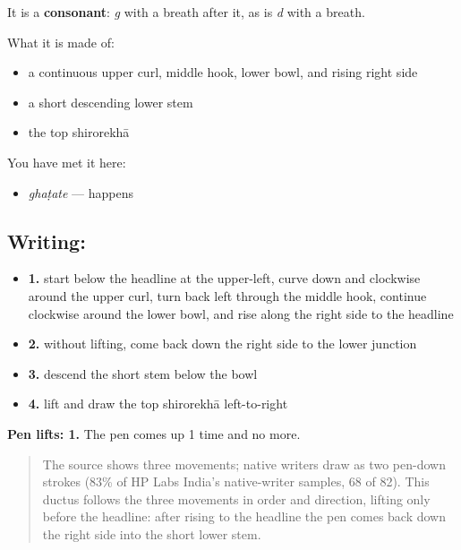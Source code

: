 It is a \textbf{consonant}: \emph{g} with a breath after it, as \textbf{} is \emph{d} with a breath.

What it is made of:

\begin{itemize}
\raggedright
  \item a continuous upper curl, middle hook, lower bowl, and rising right side
  \item a short descending lower stem
  \item the top shirorekhā
\end{itemize}

You have met it here:

\begin{itemize}
\raggedright
  \item \textbf{} \emph{ghaṭate} — happens
\end{itemize}

\subsection*{Writing: }

\begin{itemize}
\raggedright
  \item \textbf{1.} start below the headline at the upper-left, curve down and clockwise around the upper curl, turn back left through the middle hook, continue clockwise around the lower bowl, and rise along the right side to the headline
  \item \textbf{2.} without lifting, come back down the right side to the lower junction
  \item \textbf{3.} descend the short stem below the bowl
  \item \textbf{4.} lift and draw the top shirorekhā left-to-right
\end{itemize}

\textbf{Pen lifts: 1.} The pen comes up 1 time and no more.

\begin{quote}
The source shows three movements; native writers draw  as two pen-down strokes (83\% of HP Labs India's native-writer samples, 68 of 82). This ductus follows the three movements in order and direction, lifting only before the headline: after rising to the headline the pen comes back down the right side into the short lower stem.
\end{quote}

